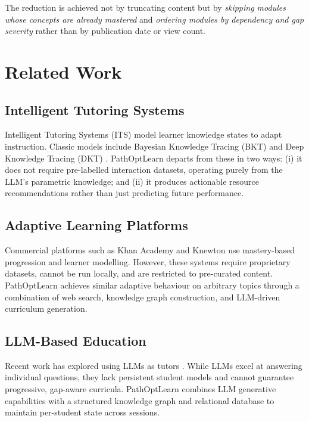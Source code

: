 \documentclass[12pt,a4paper]{article}
\begin{document}
The reduction is achieved not by truncating content but by \emph{skipping
modules whose concepts are already mastered} and \emph{ordering modules by
dependency and gap severity} rather than by publication date or view count.

\section{Related Work}

\subsection{Intelligent Tutoring Systems}

Intelligent Tutoring Systems (ITS) \cite{bloom1984two} model learner
knowledge states to adapt instruction. Classic models include Bayesian
Knowledge Tracing (BKT) \cite{corbett1994knowledge} and Deep Knowledge
Tracing (DKT) \cite{piech2015deep}. PathOptLearn departs from these in two
ways: (i) it does not require pre-labelled interaction datasets, operating
purely from the LLM's parametric knowledge; and (ii) it produces actionable
resource recommendations rather than just predicting future performance.

\subsection{Adaptive Learning Platforms}

Commercial platforms such as Khan Academy \cite{khanacademy} and Knewton
\cite{knewton2019} use mastery-based progression and learner modelling.
However, these systems require proprietary datasets, cannot be run locally,
and are restricted to pre-curated content. PathOptLearn achieves similar
adaptive behaviour on arbitrary topics through a combination of web search,
knowledge graph construction, and LLM-driven curriculum generation.

\subsection{LLM-Based Education}

Recent work has explored using LLMs as tutors
\cite{liu2023summary,macina2023mathdial}. While LLMs excel at answering
individual questions, they lack persistent student models and cannot
guarantee progressive, gap-aware curricula. PathOptLearn combines LLM
generative capabilities with a structured knowledge graph and relational
database to maintain per-student state across sessions.
\end{document}
